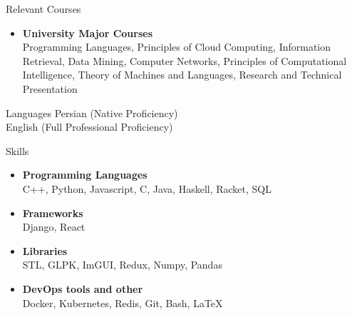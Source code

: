 \documentclass{resume} %
\begin{document}




\begin{rSection}{Relevant Courses}
    \begin{itemize}[leftmargin=*]
        \item
            {\bf University Major Courses}
            \\ Programming Languages, Principles of Cloud Computing, Information Retrieval, Data Mining, Computer Networks, Principles of Computational Intelligence, Theory of Machines and Languages, Research and Technical Presentation
    \end{itemize}
\end{rSection}

\begin{rSection}{Languages}
    Persian (Native Proficiency)\\
    English (Full Professional Proficiency)\\
\end{rSection}

\begin{rSection}{Skills}
    \begin{itemize}[leftmargin=*]
        \item
            {\bf Programming Languages}
            \\ C++, Python, Javascript, C, Java, Haskell, Racket, SQL
        \item
            {\bf Frameworks}
            \\ Django, React
        \item
            {\bf Libraries}
            \\ STL, GLPK, ImGUI, Redux, Numpy, Pandas 
        \item
            {\bf DevOps tools and other}
            \\ Docker, Kubernetes, Redis, Git, Bash, \LaTeX
    \end{itemize}

\end{rSection}
\end{document}
